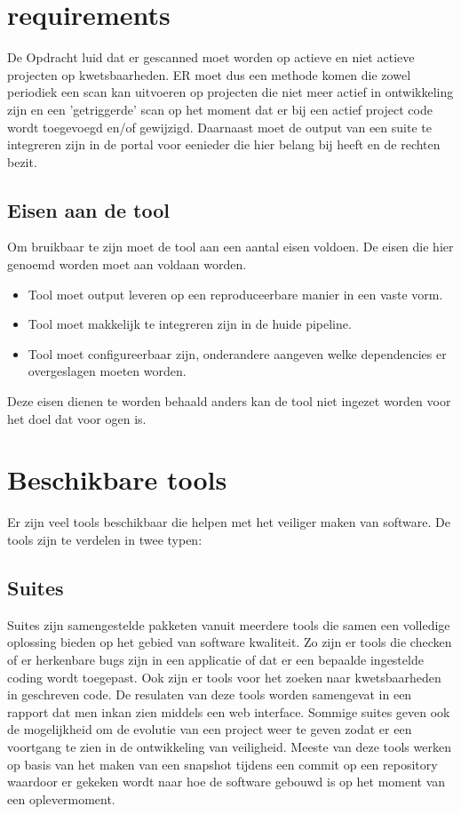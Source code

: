 \section{requirements}
De Opdracht luid dat er gescanned moet worden op actieve en niet actieve projecten op kwetsbaarheden. ER moet dus een methode komen die zowel periodiek een scan kan uitvoeren op projecten die niet meer actief in ontwikkeling zijn en een 'getriggerde' scan op het moment dat er bij een actief project code wordt toegevoegd en/of gewijzigd. Daarnaast moet de output van een suite te integreren zijn in de portal voor eenieder die hier belang bij heeft en de rechten bezit.

\subsection{Eisen aan de tool}
Om bruikbaar te zijn moet de tool aan een aantal eisen voldoen. De eisen die hier genoemd worden moet aan voldaan worden.
\begin{itemize}
    \item Tool moet output leveren op een reproduceerbare manier in een vaste vorm.
    \item Tool moet makkelijk te integreren zijn in de huide pipeline.
    \item Tool moet configureerbaar zijn, onderandere aangeven welke dependencies er overgeslagen moeten worden.
\end{itemize}
Deze eisen dienen te worden behaald anders kan de tool niet ingezet worden voor het doel dat voor ogen is.



\section{Beschikbare tools}
Er zijn veel tools beschikbaar die helpen met het veiliger maken van software. De tools zijn te verdelen in twee typen:

\subsection{Suites}
Suites zijn samengestelde pakketen vanuit meerdere tools die samen een volledige oplossing bieden op het gebied van software kwaliteit. Zo zijn er tools die checken of er herkenbare bugs zijn in een applicatie of dat er een bepaalde ingestelde coding wordt toegepast. Ook zijn er tools voor het zoeken naar kwetsbaarheden in geschreven code. De resulaten van deze tools worden samengevat in een rapport dat men inkan zien middels een web interface. Sommige suites geven ook de mogelijkheid om de evolutie van een project weer te geven zodat er een voortgang te zien in de ontwikkeling van veiligheid. Meeste van deze tools werken op basis van het maken van een snapshot tijdens een commit op een repository waardoor er gekeken wordt naar hoe de software gebouwd is op het moment van een oplevermoment.


